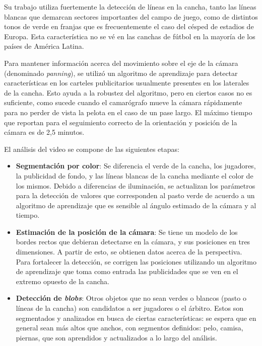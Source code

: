\documentclass[a4paper,10pt]{article}
\begin{document}
Su trabajo utiliza fuertemente la detección de líneas en la cancha, tanto las líneas blancas que demarcan sectores
importantes del campo de juego, como de distintos tonos de verde en franjas que es frecuentemente el caso del césped de
estadios de Europa. Esta característica no se vé en las canchas de fútbol en la mayoría de los países de América Latina.

Para mantener información acerca del movimiento sobre el eje de la cámara (denominado \textit{panning}), se utilizó
un algoritmo de aprendizaje para detectar características en los carteles publicitarios usualmente presentes en los
laterales de la cancha. Esto ayuda a la robustez del algoritmo, pero en ciertos casos no es suficiente, como sucede
cuando el camarógrafo mueve la cámara rápidamente para no perder de vista la pelota en el caso de un pase largo.
El máximo tiempo que reportan para el seguimiento correcto de la orientación y posición de la cámara es de 2,5 minutos.

El análisis del video se compone de las siguientes etapas:

\begin{itemize}
  \item \textbf{Segmentación por color}: Se diferencia el verde de la cancha, los jugadores, la publicidad de fondo,
  y las líneas blancas de la cancha mediante el color de los mismos. Debido a diferencias de
  iluminación, se actualizan los parámetros para la detección de valores que corresponden al pasto verde de acuerdo
  a un algoritmo de aprendizaje que es sensible al ángulo estimado de la cámara y al tiempo.
  \item \textbf{Estimación de la posición de la cámara}: Se tiene un modelo de los bordes rectos que debieran detectarse
  en la cámara, y sus posiciones en tres dimensiones. A partir de esto, se obtienen datos acerca de la perspectiva.
  Para fortalecer la detección, se
  corrigen las posiciones utilizando un algoritmo de aprendizaje que toma como entrada las publicidades que se ven en 
  el extremo opuesto de la cancha.
  \item \textbf{Detección de \textit{blobs}}: Otros objetos que no sean verdes o blancos (pasto o líneas de la cancha)
  son candidatos a ser jugadores o el árbitro. Estos son segmentados y analizados en busca de ciertas características:
  se espera que en general sean más altos que anchos, con segmentos definidos: pelo, camisa, piernas, que son
  aprendidos y actualizados a lo largo del análisis.
\end{itemize}
\end{document}
